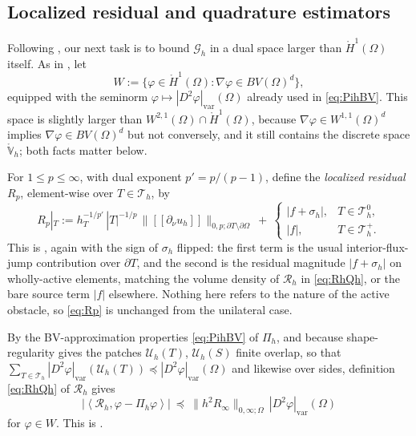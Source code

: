 \documentclass[12pt]{amsart}
\theoremstyle{definition}
\newcommand{\Om}{\Omega}
\newcommand{\dOm}{\partial\Omega}
\newcommand{\Th}{\mathcal{T}_h}
\newcommand{\Vhr}{\mathring{\mathbb{V}}_h}
\newcommand{\Pih}{\Pi_h}
\newcommand{\Uh}{\mathcal{U}_h}
\newcommand{\Thplus}{\Th^+}
\newcommand{\Thzero}{\Th^0}
\newcommand{\Gh}{\mathcal{G}_h}
\newcommand{\Rh}{\mathcal{R}_h}
\newcommand{\jump}[1]{[\![#1]\!]}
\begin{document}
\subsection{Localized residual and quadrature estimators}

Following \cite[\S\S 4--5]{NSV03}, our next task is to bound $\Gh$ in a dual space larger than $\mathring H^1(\Om)$ itself.  As in \cite[\S 3.2]{NSV03}, let
\begin{equation}
\label{eq:W}
  W := \{\varphi \in \mathring H^1(\Om) : \nabla\varphi \in BV(\Om)^d\},
\end{equation}
equipped with the seminorm $\varphi \mapsto |D^2\varphi|_{\mathrm{var}}(\Om)$ already used in \eqref{eq:PihBV}.  This space is slightly larger than $W^{2,1}(\Om) \cap \mathring H^1(\Om)$, because $\nabla\varphi \in W^{1,1}(\Om)^d$ implies $\nabla\varphi \in BV(\Om)^d$ but not conversely, and it still contains the discrete space $\Vhr$; both facts matter below.

For $1 \le p \le \infty$, with dual exponent $p' = p/(p-1)$, define the \emph{localized residual} $R_p$, element-wise over $T\in\Th$, by
\begin{equation}
\label{eq:Rp}
  R_p|_T := h_T^{-1/p'}\,|T|^{-1/p}\,\bigl\|\jump{\partial_\nu u_h}\bigr\|_{0,p;\partial T \setminus \dOm}
  \ +\ \begin{cases} |f + \sigma_h|, & T \in \Thzero, \\ |f|, & T \in \Thplus. \end{cases}
\end{equation}
This is \cite[formula (3.7)]{NSV03}, again with the sign of $\sigma_h$ flipped: the first term is the usual interior-flux-jump contribution over $\partial T$, and the second is the residual magnitude $|f+\sigma_h|$ on wholly-active elements, matching the volume density of $\Rh$ in \eqref{eq:RhQh}, or the bare source term $|f|$ elsewhere.  Nothing here refers to the nature of the active obstacle, so \eqref{eq:Rp} is unchanged from the unilateral case.

By the BV-approximation properties \eqref{eq:PihBV} of $\Pih$, and because shape-regularity gives the patches $\Uh(T)$, $\Uh(S)$ finite overlap, so that $\sum_{T\in\Th} |D^2\varphi|_{\mathrm{var}}(\Uh(T)) \preceq |D^2\varphi|_{\mathrm{var}}(\Om)$ and likewise over sides, definition \eqref{eq:RhQh} of $\Rh$ gives
\begin{equation}
\label{eq:Rhbound}
  \bigl|\left<\Rh,\varphi-\Pih\varphi\right>\bigr| \ \preceq\ \|h^2 R_\infty\|_{0,\infty;\Om}\, |D^2\varphi|_{\mathrm{var}}(\Om)
\end{equation}
for $\varphi \in W$.  This is \cite[formula (3.8)]{NSV03}.
\end{document}
